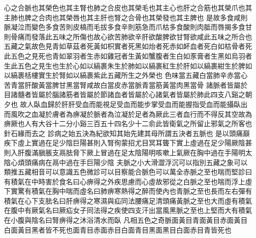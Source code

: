 心之合脈也其榮色也其主腎也肺之合皮也其榮毛也其主心也肝之合筋也其榮爪也其主肺也脾之合肉也其榮唇也其主肝也腎之合骨也其榮發也其主脾也
是故多食咸則脈凝泣而變色多食苦則皮槁而毛拔多食辛則筋急而爪枯多食酸則肉胝而唇揭多食甘則骨痛而發落此五味之所傷也故心欲苦肺欲辛肝欲酸脾欲甘腎欲咸此五味之所合也
五藏之氣故色見青如草茲者死黃如枳實者死黑如炲者死赤如衃血者死白如枯骨者死此五色之見死也青如翠羽者生赤如雞冠者生黃如蟹腹者生白如豕膏者生黑如烏羽者生此五色之見生也生於心如以縞裹朱生於肺如以縞裹紅生於肝如以縞裹紺生於脾如以縞裹栝樓實生於腎如以縞裹紫此五藏所生之外榮也
色味當五藏白當肺辛赤當心苦青當肝酸黃當脾甘黑當腎咸故白當皮赤當脈青當筋黃當肉黑當骨
諸脈者皆屬於目諸髓者皆屬於腦諸筋者皆屬於節諸血者皆屬於心諸氣者皆屬於肺此四支八谿之朝夕也
故人臥血歸於肝肝受血而能視足受血而能步掌受血而能握指受血而能攝臥出而風吹之血凝於膚者為痹凝於脈者為泣凝於足者為厥此三者血行而不得反其空故為痹厥也人有大谷十二分小谿三百五十四名少十二俞此皆衛氣之所留止邪氣之所客也針石緣而去之
診病之始五決為紀欲知其始先建其母所謂五決者五脈也
是以頭痛巔疾下虛上實過在足少陰巨陽甚則入腎徇蒙招尤目冥耳聾下實上虛過在足少陽厥陰甚則入肝腹滿䐜脹支鬲胠脅下厥上冒過在足太陰陽明咳嗽上氣厥在胸中過在手陽明太陰心煩頭痛病在鬲中過在手巨陽少陰
夫脈之小大滑澀浮沉可以指別五藏之象可以類推五藏相音可以意識五色微診可以目察能合脈色可以萬全赤脈之至也喘而堅診曰有積氣在中時害於食名曰心痹得之外疾思慮而心虛故邪從之白脈之至也喘而浮上虛下實驚有積氣在胸中喘而虛名曰肺痹寒熱得之醉而使內也青脈之至也長而左右彈有積氣在心下支胠名曰肝痹得之寒濕與疝同法腰痛足清頭痛黃脈之至也大而虛有積氣在腹中有厥氣名曰厥疝女子同法得之疾使四支汗出當風黑脈之至也上堅而大有積氣在小腹與陰名曰腎痹得之沐浴清水而臥
凡相五色之奇脈面黃目青面黃目赤面黃目白面黃目黑者皆不死也面青目赤面赤目白面青目黑面黑目白面赤目青皆死也





